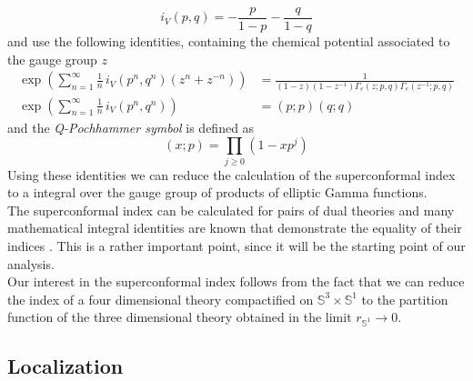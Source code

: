 \begin{equation}
i_V(p,q) = - \frac{p}{1-p} - \frac{q}{1-q}
\end{equation}
and use the following identities, containing the chemical potential associated to the gauge group $z$
\begin{align}
\exp \left(  
\sum_{n=1}^{\infty} \frac{1}{n}\, i_V(p^n,q^n) ( z^n + z^{-n}) \right) & = \frac{1}{(1-z)(1-z^{-1}) \Gamma_e(z;p,q) \Gamma_e(z^{-1};p,q)}
\\
\exp \left(
\sum_{n=1}^{\infty} \frac{1}{n} \, i_V(p^n,q^n) \right) & = (p;p) (q;q)
\end{align}
and the \emph{Q-Pochhammer symbol} is defined as
\begin{equation}
(x;p) = \prod_{j \geq 0} ( 1- x p^j)
\end{equation}
Using these identities we can reduce the calculation of the superconformal index to a integral over the gauge group of products of elliptic Gamma functions.\\
The superconformal index can be calculated for pairs of dual theories and many mathematical integral identities are known that demonstrate the equality of their indices \cite{rains309252transformations} \cite{Dolan:2008qi}. 
This is a rather important point, since it will be the starting point of our analysis.\\
Our interest in the superconformal index follows from the fact that we can reduce the index of a four dimensional theory compactified on $\mathbb{S}^3 \times \mathbb{S}^1$ to the partition function of the three dimensional theory obtained in the limit $r_{\mathbb{S}^1} \rightarrow 0$.

\subsection{Localization}



